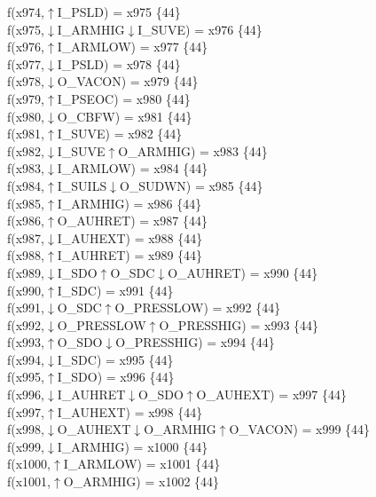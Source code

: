 f(x974,$\uparrow$I\_PSLD) = x975 \{44\} \\  
f(x975,$\downarrow$I\_ARMHIG$\downarrow$I\_SUVE) = x976 \{44\} \\  
f(x976,$\uparrow$I\_ARMLOW) = x977 \{44\} \\  
f(x977,$\downarrow$I\_PSLD) = x978 \{44\} \\  
f(x978,$\downarrow$O\_VACON) = x979 \{44\} \\  
f(x979,$\uparrow$I\_PSEOC) = x980 \{44\} \\  
f(x980,$\downarrow$O\_CBFW) = x981 \{44\} \\  
f(x981,$\uparrow$I\_SUVE) = x982 \{44\} \\  
f(x982,$\downarrow$I\_SUVE$\uparrow$O\_ARMHIG) = x983 \{44\} \\  
f(x983,$\downarrow$I\_ARMLOW) = x984 \{44\} \\  
f(x984,$\uparrow$I\_SUILS$\downarrow$O\_SUDWN) = x985 \{44\} \\  
f(x985,$\uparrow$I\_ARMHIG) = x986 \{44\} \\  
f(x986,$\uparrow$O\_AUHRET) = x987 \{44\} \\  
f(x987,$\downarrow$I\_AUHEXT) = x988 \{44\} \\  
f(x988,$\uparrow$I\_AUHRET) = x989 \{44\} \\  
f(x989,$\downarrow$I\_SDO$\uparrow$O\_SDC$\downarrow$O\_AUHRET) = x990 \{44\} \\  
f(x990,$\uparrow$I\_SDC) = x991 \{44\} \\  
f(x991,$\downarrow$O\_SDC$\uparrow$O\_PRESSLOW) = x992 \{44\} \\  
f(x992,$\downarrow$O\_PRESSLOW$\uparrow$O\_PRESSHIG) = x993 \{44\} \\  
f(x993,$\uparrow$O\_SDO$\downarrow$O\_PRESSHIG) = x994 \{44\} \\  
f(x994,$\downarrow$I\_SDC) = x995 \{44\} \\  
f(x995,$\uparrow$I\_SDO) = x996 \{44\} \\  
f(x996,$\downarrow$I\_AUHRET$\downarrow$O\_SDO$\uparrow$O\_AUHEXT) = x997 \{44\} \\  
f(x997,$\uparrow$I\_AUHEXT) = x998 \{44\} \\  
f(x998,$\downarrow$O\_AUHEXT$\downarrow$O\_ARMHIG$\uparrow$O\_VACON) = x999 \{44\} \\  
f(x999,$\downarrow$I\_ARMHIG) = x1000 \{44\} \\  
f(x1000,$\uparrow$I\_ARMLOW) = x1001 \{44\} \\  
f(x1001,$\uparrow$O\_ARMHIG) = x1002 \{44\} \\  
